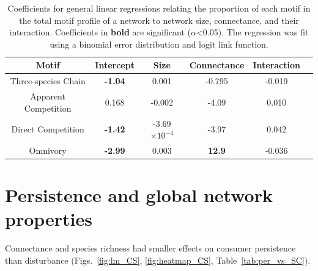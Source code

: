 \documentclass[12pt]{article}
\begin{document}
\begin{spacing}{2.0}
     \begin{table}[hb!]
        \centering
        \caption{Coefficients for general linear regressions relating the proportion of each motif in the total motif profile of a network to network size, connectance, and their interaction. Coefficients in \textbf{bold} are significant ($\alpha$\textless0.05). The regression was fit using a binomial error distribution and logit link function.}
       \label{network_prop_lms}
       \begin{tabular}{c|c c c c c}
            Motif & Intercept & Size & Connectance & Interaction \\
            \hline
            Three-species Chain & \textbf{-1.04} & 0.001 & -0.795 & -0.019 \\
            Apparent Competition & 0.168 & -0.002 & -4.09 & 0.010 \\
            Direct Competition & \textbf{-1.42} & -3.69$\times10^{-4}$ & -3.97 & 0.042 \\
            Omnivory & \textbf{-2.99} & 0.003 & \textbf{12.9} & -0.036\\
            \hline
            \end{tabular}
    \end{table}        
\clearpage
    
            

\section{Persistence and global network properties}

    Connectance and species richness had smaller effects on consumer persistence than disturbance (Figs.~\ref{fig:lm_CS}, \ref{fig:heatmap_CS}, Table~\ref{tab:per_vs_SC}).


\end{spacing}
\end{document}

